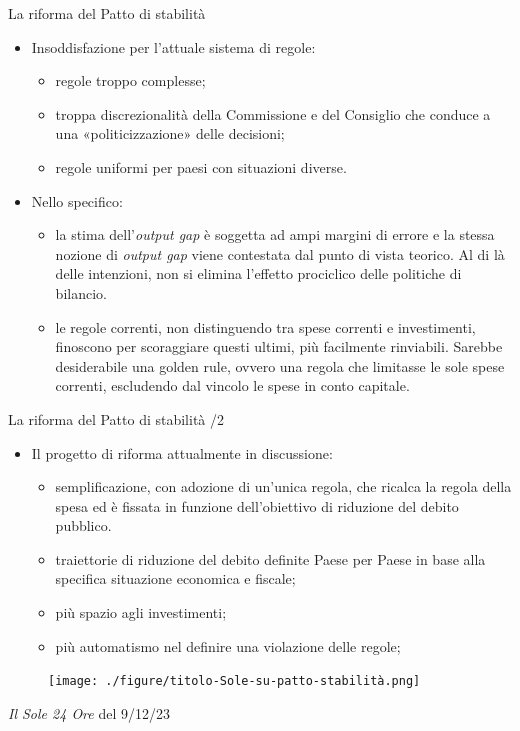 \documentclass[aspectratio=149,11pt,italian]{beamer}
\begin{document}
\begin{frame}{La riforma del Patto di stabilità}

  \begin{itemize}
  \item Insoddisfazione per l'attuale sistema di regole:
    \begin{itemize}
    \item regole troppo complesse;
    \item troppa discrezionalità della Commissione e del Consiglio che conduce
      a una «politicizzazione» delle decisioni;
    \item regole uniformi per paesi con situazioni diverse.
    \end{itemize}
  \item Nello specifico:
    \begin{itemize}
    \item la stima dell'\emph{output gap} è soggetta ad ampi margini di errore
      e la stessa nozione di \emph{output gap} viene contestata dal punto di
      vista teorico. Al di là delle intenzioni, non si elimina l'effetto
      prociclico delle politiche di bilancio.
    \item le regole correnti, non distinguendo tra spese correnti e
      investimenti, finoscono per scoraggiare questi ultimi, più facilmente
      rinviabili. Sarebbe desiderabile una \alert{golden rule}, ovvero una
      regola che limitasse le sole spese correnti, escludendo dal vincolo le
      spese in conto capitale.
    \end{itemize}
  \end{itemize}
\end{frame}


\begin{frame}{La riforma del Patto di stabilità /2}

  \begin{itemize}
  \item Il progetto di riforma attualmente in discussione:
    \begin{itemize}
    \item semplificazione, con adozione di un'unica regola, che ricalca la
      \alert{regola della spesa} ed è fissata in funzione dell'obiettivo di
      riduzione del debito pubblico.
    \item traiettorie di riduzione del debito definite Paese per Paese in base
      alla specifica situazione economica e fiscale;
    \item più spazio agli investimenti;
    \item più automatismo nel definire una violazione delle regole;
    \end{itemize}
  \end{itemize}

  \begin{figure}
    \centering
    \texttt{[image: ./figure/titolo-Sole-su-patto-stabilità.png]}
  \end{figure}
  \scriptsize \emph{Il Sole 24 Ore} del 9/12/23
\end{frame}
\end{document}
